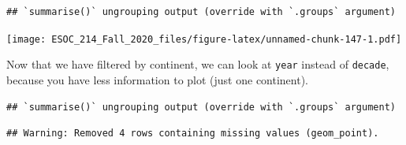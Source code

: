 \documentclass[
]{book}
\newenvironment{Shaded}{\begin{snugshade}}{\end{snugshade}}
\newcommand{\DataTypeTok}[1]{\textcolor[rgb]{0.13,0.29,0.53}{#1}}
\newcommand{\KeywordTok}[1]{\textcolor[rgb]{0.13,0.29,0.53}{\textbf{#1}}}
\newcommand{\NormalTok}[1]{#1}
\newcommand{\OperatorTok}[1]{\textcolor[rgb]{0.81,0.36,0.00}{\textbf{#1}}}
\newcommand{\OtherTok}[1]{\textcolor[rgb]{0.56,0.35,0.01}{#1}}
\newcommand{\StringTok}[1]{\textcolor[rgb]{0.31,0.60,0.02}{#1}}
\begin{document}
\begin{Shaded}
\end{Shaded}

\begin{verbatim}
## `summarise()` ungrouping output (override with `.groups` argument)
\end{verbatim}

\texttt{[image: ESOC\_214\_Fall\_2020\_files/figure-latex/unnamed-chunk-147-1.pdf]}

Now that we have filtered by continent, we can look at \texttt{year} instead of \texttt{decade}, because you have less information to plot (just one continent).

\begin{Shaded}
\end{Shaded}

\begin{verbatim}
## `summarise()` ungrouping output (override with `.groups` argument)
\end{verbatim}

\begin{verbatim}
## Warning: Removed 4 rows containing missing values (geom_point).
\end{verbatim}
\end{document}
